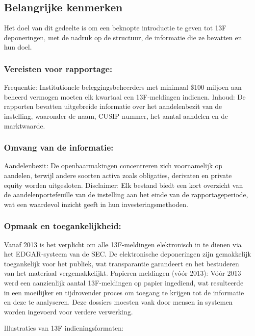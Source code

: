 \subsection{Belangrijke kenmerken}
Het doel van dit gedeelte is om een beknopte introductie te geven tot 13F deponeringen, met de nadruk op de structuur, de informatie die ze bevatten en hun doel.


\subsubsection{Vereisten voor rapportage:}

Frequentie: Institutionele beleggingsbeheerders met minimaal \$100 miljoen aan beheerd vermogen moeten elk kwartaal een 13F-meldingen indienen.
Inhoud: De rapporten bevatten uitgebreide informatie over het aandelenbezit van de instelling, waaronder de naam, CUSIP-nummer, het aantal aandelen en de marktwaarde.
\subsubsection{Omvang van de informatie:}

Aandelenbezit: De openbaarmakingen concentreren zich voornamelijk op aandelen, terwijl andere soorten activa zoals obligaties, derivaten en private equity worden uitgesloten.
Disclaimer: Elk bestand biedt een kort overzicht van de aandelenportefeuille van de instelling aan het einde van de rapportageperiode, wat een waardevol inzicht geeft in hun investeringsmethoden.
\subsubsection{Opmaak en toegankelijkheid:}

Vanaf 2013 is het verplicht om alle 13F-meldingen elektronisch in te dienen via het EDGAR-systeem van de SEC. De elektronische deponeringen zijn gemakkelijk toegankelijk voor het publiek, wat transparantie garandeert en het bestuderen van het materiaal vergemakkelijkt.
Papieren meldingen (vóór 2013): Vóór 2013 werd een aanzienlijk aantal 13F-meldingen op papier ingediend, wat resulteerde in een moeilijker en tijdrovender proces om toegang te krijgen tot de informatie en deze te analyseren. Deze dossiers moesten vaak door mensen in systemen worden ingevoerd voor verdere verwerking.

Illustraties van 13F indieningsformaten:

